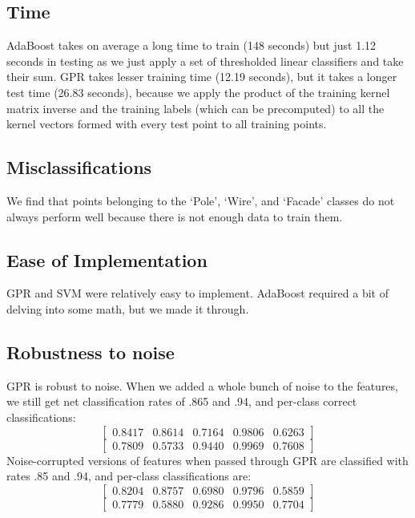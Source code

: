 \documentclass[letterpaper]{article}
\begin{document}
\subsection*{Time}

AdaBoost takes on average a long time to train (148 seconds) but just 1.12 seconds in testing as we just apply a set of thresholded linear classifiers and take their sum. GPR takes lesser training time (12.19 seconds), but it takes a longer test time (26.83 seconds), because we apply the product of the training kernel matrix inverse and the training labels (which can be precomputed) to all the kernel vectors formed with every test point to all training points.

\subsection*{Misclassifications}
We find that points belonging to the `Pole', `Wire', and `Facade' classes do not always perform well because there is not enough data to train them.

\subsection*{Ease of Implementation}

GPR and SVM were relatively easy to implement. AdaBoost required a bit of delving into some math, but 
we made it through.

\subsection*{Robustness to noise}
GPR is robust to noise. When we added a whole bunch of noise to the features, we still get net classification rates of .865 and .94, and per-class correct classifications:
$$\begin{bmatrix} 0.8417 &   0.8614 &   0.7164   & 0.9806  &  0.6263\end{bmatrix}$$
$$\begin{bmatrix} 0.7809  &  0.5733  &  0.9440&    0.9969    &0.7608\end{bmatrix}$$
Noise-corrupted versions of features when passed through GPR are classified with rates .85 and .94, and per-class classifications are:
$$\begin{bmatrix} 0.8204  &  0.8757 &   0.6980  &  0.9796 &   0.5859\end{bmatrix}$$
$$\begin{bmatrix} 0.7779  &  0.5880  &  0.9286  &  0.9950 &   0.7704\end{bmatrix}$$
\end{document}

